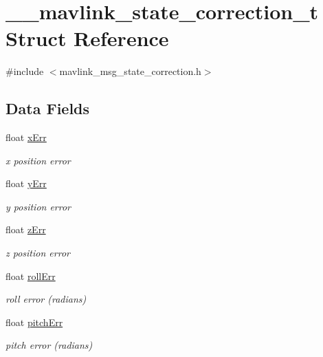 \hypertarget{struct____mavlink__state__correction__t}{\section{\-\_\-\-\_\-mavlink\-\_\-state\-\_\-correction\-\_\-t Struct Reference}
\label{struct____mavlink__state__correction__t}
}


{\ttfamily \#include $<$mavlink\-\_\-msg\-\_\-state\-\_\-correction.\-h$>$}

\subsection*{Data Fields}
\begin{DoxyCompactItemize}
\item 
float \hyperlink{struct____mavlink__state__correction__t_ab1fca88ee199d11ec9dd9c58137ad629}{x\-Err}
\begin{DoxyCompactList}\small\item\em x position error \end{DoxyCompactList}\item 
float \hyperlink{struct____mavlink__state__correction__t_aa01cccfabecbeeff9b5c960807888bfb}{y\-Err}
\begin{DoxyCompactList}\small\item\em y position error \end{DoxyCompactList}\item 
float \hyperlink{struct____mavlink__state__correction__t_aafffced7328528370e9c1393be21f3e2}{z\-Err}
\begin{DoxyCompactList}\small\item\em z position error \end{DoxyCompactList}\item 
float \hyperlink{struct____mavlink__state__correction__t_a9c95891402362b6d10ffc573db2991e9}{roll\-Err}
\begin{DoxyCompactList}\small\item\em roll error (radians) \end{DoxyCompactList}\item 
float \hyperlink{struct____mavlink__state__correction__t_a6a077d47f05b62f2440337cf7369563e}{pitch\-Err}
\begin{DoxyCompactList}\small\item\em pitch error (radians) \end{DoxyCompactList}\item 

\end{DoxyCompactItemize}
